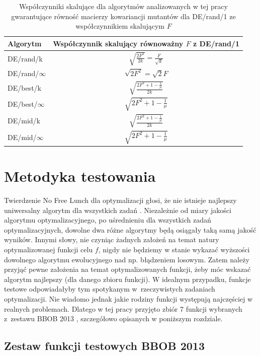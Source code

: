 \documentclass[a4paper,onecolumn,oneside,12pt,wide,floatssmall]{mwrep}
\theoremstyle{definition}
\theoremstyle{plain}%
\theoremstyle{remark}
\begin{document}
\begin{table}[H]
\centering
\begin{tabular}{ l | c }
Algorytm         & Współczynnik skalujący równoważny $F$ z DE/rand/1 \\ \hline
DE/rand/k        & $\sqrt{\frac{2F^2}{2k}} = \frac{F}{\sqrt{k}}$ \\ 
DE/rand/$\infty$ & $\sqrt{2F^2} = \sqrt{2}F$ \\ \hline
DE/best/k        & $\sqrt{\frac{2F^2 + 1 - \frac{1}{\mu}}{2k}}$ \\
DE/best/$\infty$ & $\sqrt{2F^2 + 1 - \frac{1}{\mu}}$ \\ \hline
DE/mid/k         & $\sqrt{\frac{2F^2 + 1 - \frac{1}{\mu}}{2k}}$ \\
DE/mid/$\infty$  & $\sqrt{2F^2 + 1 - \frac{1}{\mu}}$ \\
\end{tabular}
\caption{Współczynniki skalujące dla algorytmów analizowanych w tej pracy gwarantujące równość macierzy kowariancji mutantów
dla DE/rand/1 ze współczynnikiem skalującym $F$}
\label{table:wspolczynniki}
\end{table}

\chapter{Metodyka testowania}
\label{chap:metodyka}

Twierdzenie No Free Lunch dla optymalizacji głosi, że nie istnieje najlepszy uniwersalny algorytm dla wszystkich zadań \cite{lunch}. 
Niezależnie od miary jakości algorytmu optymalizacyjnego, po uśrednieniu dla wszystkich zadań optymalizacyjnych, 
dowolne dwa różne algorytmy będą osiągały taką samą jakość wyników. Innymi słowy,
nie czyniąc żadnych założeń na temat natury optymalizowanej funkcji celu $f$, 
nigdy nie będziemy w stanie wykazać wyższości dowolnego algorytmu ewolucyjnego nad np. błądzeniem losowym. 
Zatem należy przyjąć pewne założenia na temat optymalizowanych funkcji, żeby móc wskazać algorytm najlepszy (dla danego zbioru funkcji).
W idealnym przypadku, funkcje testowe odpowiadałyby tym spotykanym w~rzeczywistych zadaniach optymalizacji.
Nie wiadomo jednak jakie rodziny funkcji występują najczęściej w realnych problemach.
Dlatego w tej pracy przyjęto zbiór 7 funkcji wybranych z~zestawu BBOB 2013 \cite{noiseless}, szczegółowo opisanych w poniższym rozdziale.

\section{Zestaw funkcji testowych BBOB 2013}
\label{sec:zestaw}
\end{document}
